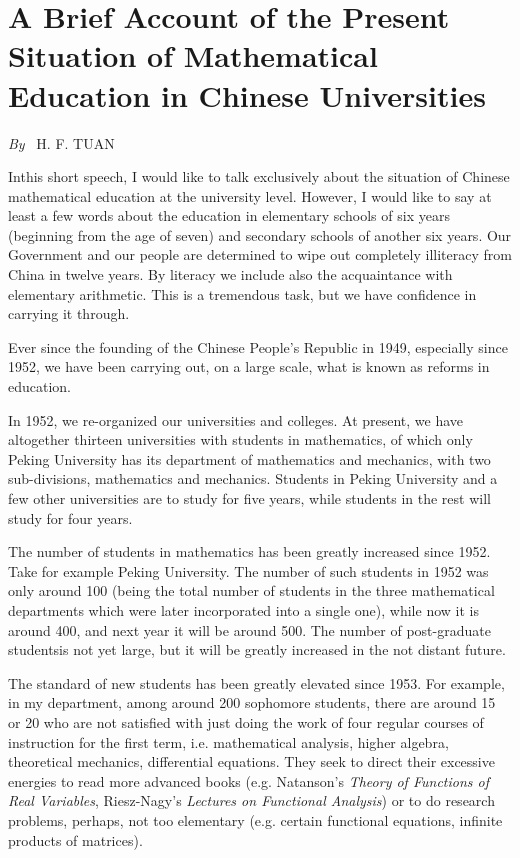 \chapter[A Brief Account of the Present Situation of Mathematical...]{A Brief Account of the Present Situation of Mathematical Education in Chinese Universities}

\begin{center}
{\em By}~ H. F. TUAN
\end{center}
\medskip

\setcounter{pageoriginal}{164}
In\pageoriginale this short speech, I would like to talk exclusively about the situation of Chinese mathematical education at the university level. However, I would like to say at least a few words about the education in elementary schools of six years (beginning from the age of seven) and secondary schools of another six years. Our Government and our people are determined to wipe out completely illiteracy from China in twelve years. By literacy we include also the acquaintance with elementary arithmetic. This is a tremendous task, but we have confidence in carrying it through.

Ever since the founding of the Chinese People's Republic in 1949, especially since 1952, we have been carrying out, on a large scale, what is known as reforms in education.

In 1952, we re-organized our universities and colleges. At present, we have altogether thirteen universities with students in mathematics, of which only Peking University has its department of mathematics and mechanics, with two sub-divisions, mathematics and mechanics. Students in Peking University and a few other universities are to study for five years, while students in the rest will study for four years.

The number of students in mathematics has been greatly increased since 1952. Take for example Peking University. The number of such students in 1952 was only around 100 (being the total number of students in the three mathematical departments which were later incorporated into a single one), while now it is around 400, and next year it will be around 500. The number of post-graduate students\pageoriginale is not yet large, but it will be greatly increased in the not distant future.

The standard of new students has been greatly elevated since 1953. For example, in my department, among around 200 sophomore students, there are around 15 or 20 who are not satisfied with just doing the work of four regular courses of instruction for the first term, i.e. mathematical analysis, higher algebra, theoretical mechanics, differential equations. They seek to direct their excessive energies to read more advanced books (e.g. Natanson's {\em Theory of Functions of Real Variables}, Riesz-Nagy's {\em Lectures on Functional Analysis}) or to do research problems, perhaps, not too elementary (e.g. certain functional equations, infinite products of matrices).

